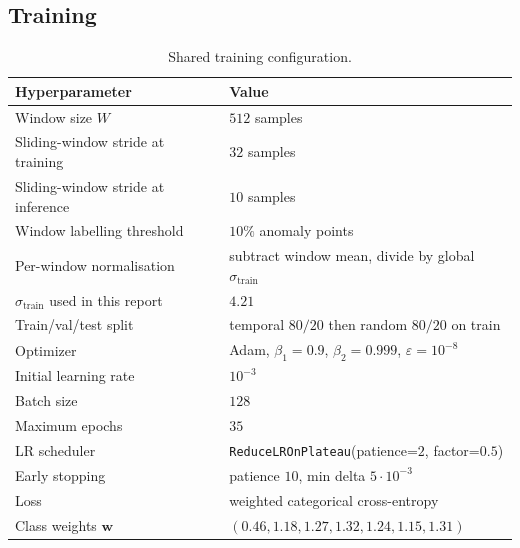 \subsection{Training}
\label{app:hp-train}

\begin{table}[H]
    \centering
    \footnotesize
    \begin{tabular}{ll}
        \toprule
        Hyperparameter & Value \\
        \midrule
        Window size $W$                          & $512$ samples \\
        Sliding-window stride at training        & $32$ samples \\
        Sliding-window stride at inference       & $10$ samples \\
        Window labelling threshold               & $10\%$ anomaly points \\
        Per-window normalisation                 & subtract window mean, divide by global $\sigma_{\mathrm{train}}$ \\
        $\sigma_{\mathrm{train}}$ used in this report & $4.21$ \\
        Train/val/test split                     & temporal $80/20$ then random $80/20$ on train \\
        Optimizer                                & Adam, $\beta_1 = 0.9$, $\beta_2 = 0.999$, $\varepsilon = 10^{-8}$ \\
        Initial learning rate                    & $10^{-3}$ \\
        Batch size                               & $128$ \\
        Maximum epochs                           & $35$ \\
        LR scheduler                             & \texttt{ReduceLROnPlateau}(patience=$2$, factor=$0.5$) \\
        Early stopping                           & patience $10$, min delta $5 \cdot 10^{-3}$ \\
        Loss                                     & weighted categorical cross-entropy \\
        Class weights $\mathbf{w}$               & $(0.46, 1.18, 1.27, 1.32, 1.24, 1.15, 1.31)$ \\
        \bottomrule
    \end{tabular}
    \caption{Shared training configuration.}
    \label{tab:train-config}
\end{table}

